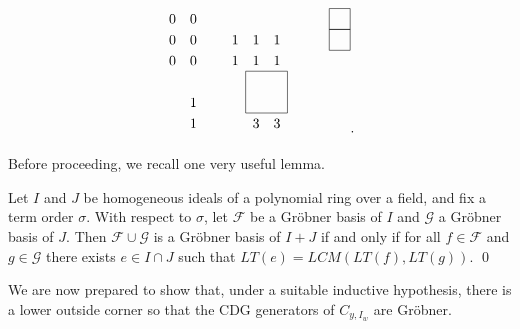 \documentclass[ALCO,Unicode,published]{cedram}
\begin{document}
\begin{example}
\[\begin{tikzpicture}[x=1.5em,y=1.5em]
      \draw[color=black](8,8)rectangle(9,9); 
      \draw[color=black](8,9)rectangle(9,10); 
      \draw[color=black](4,5)rectangle(6,7); 
      \node at (0.5,9.5) {$0$};
      \node at (1.5,9.5) {$0$};
      \node at (0.5,7.5) {$0$};
     \node at (1.5,7.5) {$0$};
      \node at (0.5,8.5) {$0$};
      \node at (1.5,8.5) {$0$};
      \node at (1.5,4.5) {$1$};
       \node at (1.5,5.5) {$1$};
       \node at (5.5,4.5) {$3$};
       \node at (4.5,4.5) {$3$};
       \node at (3.5,8.5) {$1$};
       \node at (4.5,8.5) {$1$};
       \node at (3.5,7.5) {$1$};
       \node at (4.5,7.5) {$1$};
       \node at (5.5,7.5) {$1$};
       \node at (5.5,8.5) {$1$};
     \end{tikzpicture}.
       \]
\end{example}

Before proceeding, we recall one very useful lemma.

\begin{lemma}\label{lem:concatinate}\cite[Lemma 1.3.14]{Con93}
Let $I$ and $J$  be  homogeneous ideals of a polynomial ring over a field, and fix a term order $\sigma$.  With respect to $\sigma$, let  $\mathcal{F}$  be  a  Gr\"obner basis of $I$ and $\mathcal{G}$ a Gr\"obner basis of $J$.  Then $\mathcal{F} \cup \mathcal{G}$ is a Gr\"obner basis of $I+J$ if and only if for all $f \in \mathcal{F}$ and $g \in \mathcal{G}$ there exists $e \in I \cap J$ such that $LT(e) = LCM(LT(f),LT(g))$. \qed
\end{lemma}

We are now prepared to show that, under a suitable inductive hypothesis, there is a lower outside corner so that the CDG generators of $C_{y,I_w}$ are Gr\"obner.
\end{document}

